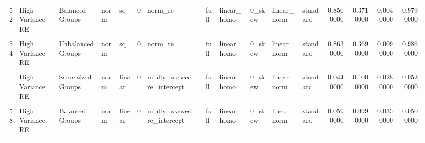 \documentclass[12pt]{article}
\begin{document}
\begin{table}
{\begin{tabular}[t]{rllllrllllllrrrr}
52 & High Variance RE & Balanced Groups & norm & sq & 0 & norm\_re & full & linear\_homo & 0\_skew & linear\_norm & standard & 0.8500000 & 0.3710000 & 0.0040000 & 0.9790000\\
\cellcolor{gray!6}{53} & \cellcolor{gray!6}{High Variance Error} & \cellcolor{gray!6}{Unbalanced Groups} & \cellcolor{gray!6}{norm} & \cellcolor{gray!6}{sq} & \cellcolor{gray!6}{0} & \cellcolor{gray!6}{norm\_re} & \cellcolor{gray!6}{full} & \cellcolor{gray!6}{linear\_homo} & \cellcolor{gray!6}{0\_skew} & \cellcolor{gray!6}{linear\_norm} & \cellcolor{gray!6}{standard} & \cellcolor{gray!6}{0.0610000} & \cellcolor{gray!6}{0.1030000} & \cellcolor{gray!6}{0.0760000} & \cellcolor{gray!6}{0.5710000}\\
54 & High Variance RE & Unbalanced Groups & norm & sq & 0 & norm\_re & full & linear\_homo & 0\_skew & linear\_norm & standard & 0.8630000 & 0.3690000 & 0.0090000 & 0.9860000\\
\cellcolor{gray!6}{55} & \cellcolor{gray!6}{High Variance Error} & \cellcolor{gray!6}{Same-sized Groups} & \cellcolor{gray!6}{norm} & \cellcolor{gray!6}{linear} & \cellcolor{gray!6}{0} & \cellcolor{gray!6}{mildly\_skewed\_re\_intercept} & \cellcolor{gray!6}{full} & \cellcolor{gray!6}{linear\_homo} & \cellcolor{gray!6}{0\_skew} & \cellcolor{gray!6}{linear\_norm} & \cellcolor{gray!6}{standard} & \cellcolor{gray!6}{0.0540000} & \cellcolor{gray!6}{0.1130000} & \cellcolor{gray!6}{0.0940000} & \cellcolor{gray!6}{0.0360000}\\
\addlinespace
56 & High Variance RE & Same-sized Groups & norm & linear & 0 & mildly\_skewed\_re\_intercept & full & linear\_homo & 0\_skew & linear\_norm & standard & 0.0440000 & 0.1000000 & 0.0280000 & 0.0520000\\
\cellcolor{gray!6}{57} & \cellcolor{gray!6}{High Variance Error} & \cellcolor{gray!6}{Balanced Groups} & \cellcolor{gray!6}{norm} & \cellcolor{gray!6}{linear} & \cellcolor{gray!6}{0} & \cellcolor{gray!6}{mildly\_skewed\_re\_intercept} & \cellcolor{gray!6}{full} & \cellcolor{gray!6}{linear\_homo} & \cellcolor{gray!6}{0\_skew} & \cellcolor{gray!6}{linear\_norm} & \cellcolor{gray!6}{standard} & \cellcolor{gray!6}{0.0490000} & \cellcolor{gray!6}{0.1100000} & \cellcolor{gray!6}{0.1120000} & \cellcolor{gray!6}{0.0610000}\\
58 & High Variance RE & Balanced Groups & norm & linear & 0 & mildly\_skewed\_re\_intercept & full & linear\_homo & 0\_skew & linear\_norm & standard & 0.0590000 & 0.0990000 & 0.0330000 & 0.0500000\\
\cellcolor{gray!6}{59} & \cellcolor{gray!6}{High Variance Error} & \cellcolor{gray!6}{Unbalanced Groups} & \cellcolor{gray!6}{norm} & \cellcolor{gray!6}{linear} & \cellcolor{gray!6}{0} & \cellcolor{gray!6}{mildly\_skewed\_re\_intercept} & \cellcolor{gray!6}{full} & \cellcolor{gray!6}{linear\_homo} & \cellcolor{gray!6}{0\_skew} & \cellcolor{gray!6}{linear\_norm} & \cellcolor{gray!6}{standard} & \cellcolor{gray!6}{0.0420000} & \cellcolor{gray!6}{0.0850000} & \cellcolor{gray!6}{0.1000000} & \cellcolor{gray!6}{0.0590000}\\

\end{tabular}}
\end{table}
\end{document}
